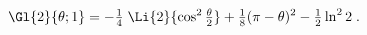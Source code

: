 \begin{equation}
\Gl{2}{\theta; 1} = 
-\tfrac{1}{4}\; \Li{2}{\cos^2{\tfrac{\theta}{2}}}
+ \tfrac{1}{8}(\pi-\theta)^2 
- \tfrac{1}{2} \ln^2{2} \; .
\end{equation}

